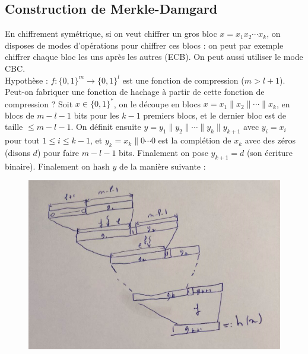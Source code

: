         \subsection{Construction de Merkle-Damgard}
            En chiffrement symétrique, si on veut chiffrer un gros bloc $x = x_1 x_2 \cdots x_k$, on disposes de modes d'opérations pour chiffrer ces blocs : on peut par exemple chiffrer chaque bloc les uns après les autres (ECB). On peut aussi utiliser le mode CBC. \\
            Hypothèse : $f : \{0,1\}^m \to \{0,1\}^l$ est une fonction de compression ($m > l + 1$). Peut-on fabriquer une fonction de hachage à partir de cette fonction de compression ? Soit $x \in \{0, 1\}^*$, on le découpe en blocs $x = x_1 \| x_2 \| \cdots \| x_k$, en blocs de $m - l - 1$ bits pour les $k - 1$ premiers blocs, et le dernier bloc est de taille $\leq m - l - 1$. On définit ensuite $y = y_1 \| y_2 \| \cdots \| y_k \| y_{k + 1}$ avec $y_i = x_i$ pour tout $1 \leq i \leq k - 1$, et $y_k = x_k \| 0 \cdots 0$ est la complétion de $x_k$ avec des zéros (disons $d$) pour faire $m - l - 1$ bits. Finalement on pose $y_{k + 1} = d$ (son écriture binaire). Finalement on hash $y$ de la manière suivante :
            
            \begin{figure}[H]
                \centering
                \includegraphics[width=.7\textwidth]{06}
            \end{figure} \noindent

